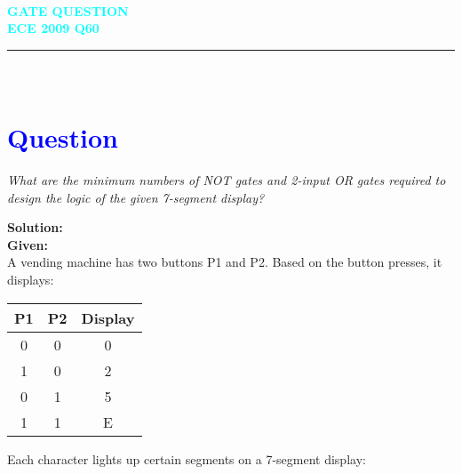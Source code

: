 \documentclass[12pt]{article}
\begin{document}
\pagestyle{empty} %

\thispagestyle{fancy} %
\fancyhf{} %
\renewcommand{\headrulewidth}{0pt} %

\vspace{10cm}
\begin{center}
   
    {\LARGE \textbf{\textcolor{cyan}{\\  GATE QUESTION \\ ECE 2009 Q60}}}
\end{center}
\vspace{0.5cm}
\noindent\rule{\textwidth}{0.5pt}
\vspace{0.5cm}

\vspace{-1cm} %

\section*{\textcolor{blue}{\\Question}}


\textit{What are the minimum numbers of NOT gates and 2-input OR gates required to design the logic of the given 7-segment display?}

\vspace{1em}
\textbf{Solution:}\\
\textbf{Given:} \\A vending machine has two buttons P1 and P2. Based on the button presses, it displays:
\begin{center}
\begin{tabular}{|c|c|c|}
\hline
P1 & P2 & Display \\
\hline
0 & 0 & 0 \\
1 & 0 & 2 \\
0 & 1 & 5 \\
1 & 1 & E \\
\hline
\end{tabular}
\end{center}

Each character lights up certain segments on a 7-segment display:
\end{document}
